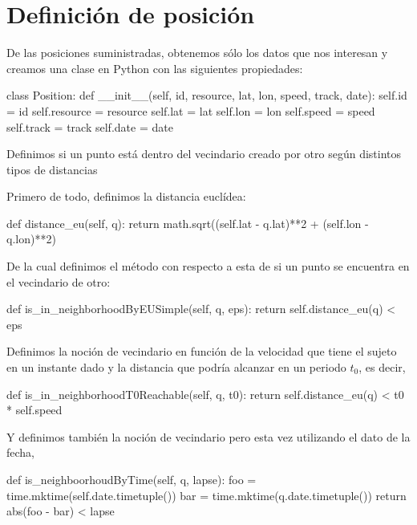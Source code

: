 \documentclass[a4paper, 12pt]{article}
\begin{document}
\section{Definici\'on de posici\'on}

De las posiciones suministradas, obtenemos s\'olo los datos que nos interesan y creamos una clase en Python con las siguientes propiedades:

\begin{python}
class Position:
    def __init__(self, id, resource, lat, lon, speed, track, date):
    		self.id = id
        self.resource = resource
        self.lat = lat
        self.lon = lon
        self.speed = speed
        self.track = track
        self.date = date
\end{python}

Definimos si un punto est\'a dentro del vecindario creado por otro seg\'un distintos tipos de distancias

Primero de todo, definimos la distancia eucl\'idea:

\begin{python}
	def distance_eu(self, q):
    		return math.sqrt((self.lat - q.lat)**2 + (self.lon - q.lon)**2)
\end{python}

De la cual definimos el m\'etodo con respecto a esta de si un punto se encuentra en el vecindario de otro:

\begin{python}
	def is_in_neighborhoodByEUSimple(self, q, eps):
    		return self.distance_eu(q) < eps
\end{python}

Definimos la noci\'on de vecindario en funci\'on de la velocidad que tiene el sujeto en un instante dado y la distancia que podr\'ia alcanzar en un periodo $t_0$, es decir,

\begin{python}
	def is_in_neighborhoodT0Reachable(self, q, t0):
    		return self.distance_eu(q) < t0 * self.speed
\end{python}

Y definimos tambi\'en la noci\'on de vecindario pero esta vez utilizando el dato de la fecha,

\begin{python}
	def is_neighboorhoudByTime(self, q, lapse):
    		foo = time.mktime(self.date.timetuple())
        bar = time.mktime(q.date.timetuple())
		return abs(foo - bar) < lapse

\end{python}
\end{document}
